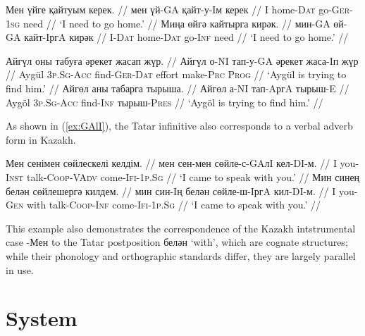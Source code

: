 \documentclass[11pt]{article}
\newcommand{\gmk}[1]{{\qipb\scshape #1}}
\newcommand{\eng}[1]{`#1'}
\begin{document}
\pex[everygla=,everyglb=,everyglc=,aboveglbskip=0pt,aboveglftskip=0ex]  %
\label{ex:kerek}
\a
\begingl
\gla Мен үйге қайтуым керек. //
\glb мен үй-GA қайт-у-Iм керек //
\glb I home-\gmk{Dat} go-\gmk{Ger}-\gmk{1sg} need //
\glft \eng{I need to go home.} //
\endgl
\a
\begingl
\gla Миңа өйгә кайтырга кирәк. //
\glb мин-GA өй-GA кайт-IргA кирәк //
\glb I-\gmk{Dat} home-\gmk{Dat} go-\gmk{Inf} need //
\glft \eng{I need to go home.} //
\endgl
\xe

\pex[everygla=,everyglb=,everyglc=,aboveglbskip=0pt,aboveglftskip=0ex]  %
\label{ex:try}
\a
\begingl
\gla Айгүл оны табуға әрекет жасап жүр. //
\glb Айгүл о-NI тап-у-GA әрекет жаса-Iп жүр //
\glb Aygül \gmk{3p.Sg}-\gmk{Acc} find-\gmk{Ger}-\gmk{Dat} effort make-\gmk{Prc} \gmk{Prog} //
\glft \eng{Aygül is trying to find him.} //
\endgl
\a
\begingl
\gla Айгөл аны табарга тырыша. //
\glb Айгөл а-NI тап-AргA тырыш-E //
\glb Aygöl \gmk{3p.Sg}-\gmk{Acc} find-\gmk{Inf} тырыш-\gmk{Pres} //
\glft \eng{Aygöl is trying to find him.} //
\endgl
\xe

As shown in (\ref{ex:GAlI}), the Tatar infinitive also corresponds to a verbal adverb form in Kazakh.

\pex[everygla=,everyglb=,everyglc=,aboveglbskip=0pt,aboveglftskip=0ex]  %
\label{ex:GAlI}
\a
\begingl
\gla Мен сенімен сөйлескелі келдім. //
\glb мен сен-мен сөйле-с-GAлI кел-DI-м. //
\glb I you-\gmk{Inst} talk-\gmk{Coop}-\gmk{VAdv} come-\gmk{Ifi}-\gmk{1p.Sg} //
\glft \eng{I came to speak with you.} //
\endgl
\a
\begingl
\gla Мин синең белән сөйлешергә килдем. //
\glb мин син-Iң белән сөйле-ш-IргA кил-DI-м. //
\glb I you-\gmk{Gen} with talk-\gmk{Coop}-\gmk{Inf} come-\gmk{Ifi}-\gmk{1p.Sg} //
\glft \eng{I came to speak with you.} //
\endgl
\xe

This example also demonstrates the correspondence of the Kazakh intstrumental case -Мен to the Tatar postposition белән \eng{with}, which are cognate structures; while their phonology and orthographic standards differ, they are largely parallel in use.

\section{System}
\label{sec:sys}
\end{document}
